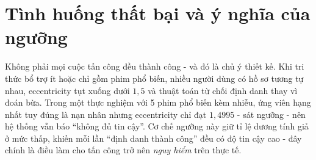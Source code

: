 \section{Tình huống thất bại và ý nghĩa của ngưỡng}

Không phải mọi cuộc tấn công đều thành công - và đó là chủ ý thiết kế. Khi tri thức bổ trợ ít hoặc chỉ gồm phim phổ biến, nhiều người dùng có hồ sơ tương tự nhau, eccentricity tụt xuống dưới $1{,}5$ và thuật toán từ chối định danh thay vì đoán bừa. Trong một thực nghiệm với 5 phim phổ biến kèm nhiễu, ứng viên hạng nhất tuy đúng là nạn nhân nhưng eccentricity chỉ đạt $1{,}4995$ - sát ngưỡng - nên hệ thống vẫn báo ``không đủ tin cậy''. Cơ chế ngưỡng này giữ tỉ lệ dương tính giả ở mức thấp, khiến mỗi lần ``định danh thành công'' đều có độ tin cậy cao - đây chính là điều làm cho tấn công trở nên \textit{nguy hiểm} trên thực tế.
